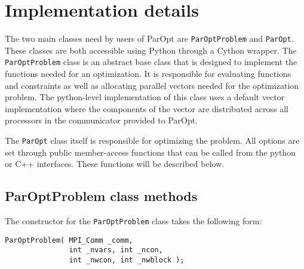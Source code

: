 \documentclass[12pt]{article}
\begin{document}
  







\section{Implementation details}

The two main classes need by users of ParOpt are \texttt{ParOptProblem} and \texttt{ParOpt}.
These classes are both accessible using Python through a Cython wrapper.
The \texttt{ParOptProblem} class is an abstract base class that is designed to implement the functions needed for an optimization. 
It is responsible for evaluating functions and constraints as well as allocating parallel vectors needed for the optimization problem.
The python-level implementation of this class uses a default vector implementation where the components of the vector are distributed across all processors in the communicator provided to ParOpt.

The \texttt{ParOpt} class itself is responsible for optimizing the problem.
All options are set through public member-access functions that can be called from the python or C++ interfaces.
These functions will be described below.

\subsection{ParOptProblem class methods}

The constructor for the \texttt{ParOptProblem} class takes the following form:
%
\begin{verbatim}
ParOptProblem( MPI_Comm _comm,
               int _nvars, int _ncon,
               int _nwcon, int _nwblock );
\end{verbatim}
\end{document}
